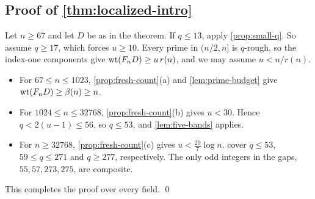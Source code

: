 \subsection{Proof of \texorpdfstring{\cref{thm:localized-intro}}{Theorem 1.2}}
Let $n\ge67$ and let $D$ be as in the theorem. If $q\le13$, apply \cref{prop:small-q}. So assume $q\ge17$, which forces $u\ge10$. Every prime in $(n/2,n]$ is $q$-rough, so the index-one components give $\operatorname{wt}(F_nD)\ge u\,r(n)$, and we may assume $u<n/r(n)$.
\begin{itemize}
\item For $67\le n\le1023$, \cref{prop:fresh-count}(a) and \cref{lem:prime-budget} give $\operatorname{wt}(F_nD)\ge\beta(n)\ge n$.
\item For $1024\le n\le32768$, \cref{prop:fresh-count}(b) gives $u<30$. Hence $q<2(u-1)\le56$, so $q\le53$, and \cref{lem:five-bands} applies.
\item For $n\ge32768$, \cref{prop:fresh-count}(c) gives $u<\frac{20}{7}\log n$.  cover $q\le53$, $59\le q\le271$ and $q\ge277$, respectively. The only odd integers in the gaps, $55,57,273,275$, are composite.
\end{itemize}
This completes the proof over every field. \qed
